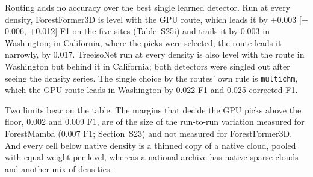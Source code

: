 \documentclass[10pt,a4paper]{article}
\begin{document}
Routing adds no accuracy over the best single learned detector. Run at every
density, ForestFormer3D is level with the GPU route, which leads it by +0.003
[$-$0.006, +0.012] F1 on the five sites (Table~S25i) and trails it by 0.003 in
Washington; in California, where the picks were selected, the route leads it
narrowly, by 0.017. TreeisoNet run at every density is also level with the route
in Washington but behind it in California; both detectors were singled out after
seeing the density series. The single choice by the routes' own rule is
\texttt{multichm}, which the GPU route leads in Washington by 0.022 F1 and 0.025
corrected F1.

Two limits bear on the table. The margins that decide the GPU picks above the
floor, 0.002 and 0.009 F1, are of the size of the run-to-run variation measured
for ForestMamba (0.007 F1; Section~S23) and not measured for ForestFormer3D. And
every cell below native density is a thinned copy of a native cloud, pooled with
equal weight per level, whereas a national archive has native sparse clouds and
another mix of densities.
\end{document}
